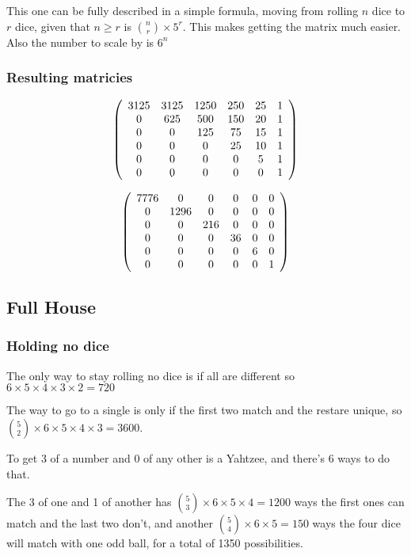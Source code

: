This one can be fully described in a simple formula, moving from rolling $n$ dice to $r$ dice, given that $n \ge r$ is ${n \choose r} \times 5^r$. This makes getting the matrix much easier. Also the number to scale by is $6^n$

\subsubsection{Resulting matricies}
\[
\left(
\begin{array}{c c c c c c}
3125 & 3125 & 1250 & 250 & 25 & 1\\
0 & 625 & 500 & 150 & 20 & 1\\
0 & 0 & 125 & 75 & 15 & 1\\
0 & 0 & 0 & 25 & 10 & 1\\
0 & 0 & 0 & 0 & 5 & 1\\
0 & 0 & 0 & 0 & 0 & 1
\end{array}
\right)
\]

\[
\left(
\begin{array}{c c c c c c}
7776 &0&0&0&0&0\\
0 & 1296&0&0&0&0\\
0 &0&216&0&0&0\\
0 &0&0&36&0&0\\
0 &0&0&0&6&0\\
0&0&0&0&0&1
\end{array}
\right)
\]

\subsection{Full House}

\subsubsection{Holding no dice}
The only way to stay rolling no dice is if all are different so $6\times5\times4\times3\times2=720$

The way to go to a single is only if the first two match and the restare unique, so ${5 \choose 2}\times6\times5\times4\times3=3600$.

To get 3 of a number and 0 of any other is a Yahtzee, and there's 6 ways to do that.

The 3 of one and 1 of another has ${5 \choose 3}\times6\times5\times4 = 1200 $ ways the first ones can match and the last two don't, and another ${5 \choose 4}\times6\times5=150$ ways the four dice will match with one odd ball, for a total of 1350 possibilities.

